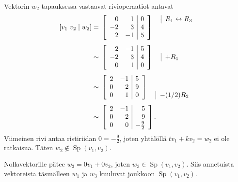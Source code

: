 \documentclass[11pt,a4paper]{amsart}
\begin{document}
\begin{solution}
  Vektorin \(w_2\) tapauksessa vastaavat rivioperaatiot antavat
  \[
    \begin{aligned}
      [v_1\ v_2\mid w_2] &={}
      \left[
        \begin{array}{rr|r}
          0 & 1 & 0 \\
          -2 & 3 & 4 \\
          2 & -1 & 5
        \end{array}
      \right]
      \quad
      \begin{array}{@{}l@{}}
        \smash{\rowop{R_1\leftrightarrow R_3}} \\
        {} \\
        {}
      \end{array}
      \\[1ex]
      &\sim{}
      \left[
        \begin{array}{rr|r}
          2 & -1 & 5 \\
          -2 & 3 & 4 \\
          0 & 1 & 0
        \end{array}
      \right]
      \quad
      \begin{array}{@{}l@{}}
        {} \\
        \smash{\rowop{+R_1}} \\
        {}
      \end{array}
      \\[1ex]
      &\sim{}
      \left[
        \begin{array}{rr|r}
          2 & -1 & 5 \\
          0 & 2 & 9 \\
          0 & 1 & 0
        \end{array}
      \right]
      \quad
      \begin{array}{@{}l@{}}
        {} \\
        {} \\
        \smash{\rowop{-(1/2)R_2}}
      \end{array}
      \\[1ex]
      &\sim{}
      \left[
        \begin{array}{rr|r}
          2 & -1 & 5 \\
          0 & 2 & 9 \\
          0 & 0 & -\frac92
        \end{array}
      \right].
    \end{aligned}
  \]
  Viimeinen rivi antaa ristiriidan \(0=-\frac92\), joten yhtälöllä
  \(tv_1+kv_2=w_2\) ei ole ratkaisua. Täten
  \(w_2\notin\operatorname{Sp}(v_1,v_2)\).

  Nollavektorille pätee \(w_3=0v_1+0v_2\), joten
  \(w_3\in\operatorname{Sp}(v_1,v_2)\). Siis annetuista vektoreista
  täsmälleen \(w_1\) ja \(w_3\) kuuluvat joukkoon
  \(\operatorname{Sp}(v_1,v_2)\).
\end{solution}
\end{document}
